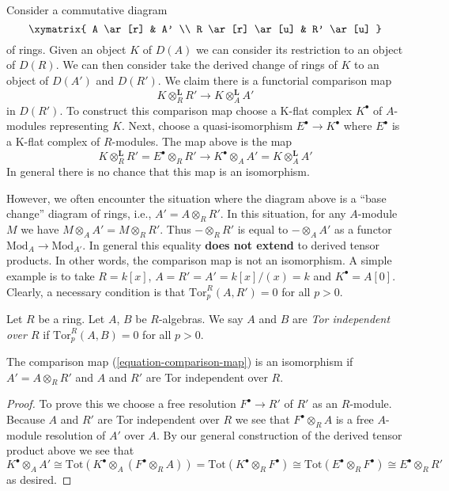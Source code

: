 \noindent
Consider a commutative diagram
$$
\xymatrix{
A \ar[r] & A' \\
R \ar[r] \ar[u] & R' \ar[u]
}
$$
of rings. Given an object $K$ of $D(A)$ we can consider its restriction
to an object of $D(R)$. We can then consider take the derived change of
rings of $K$ to an object of $D(A')$ and $D(R')$.
We claim there is a functorial comparison map
\begin{equation}
\label{equation-comparison-map}
K \otimes_R^{\mathbf{L}} R' \longrightarrow
K \otimes_A^{\mathbf{L}} A'
\end{equation}
in $D(R')$. To construct this comparison map choose a K-flat
complex $K^\bullet$ of $A$-modules representing $K$. Next, choose
a quasi-isomorphism $E^\bullet \to K^\bullet$ where $E^\bullet$
is a K-flat complex of $R$-modules. The map above is the map
$$
K \otimes_R^{\mathbf{L}} R' =
E^\bullet \otimes_R R'
\longrightarrow
K^\bullet \otimes_A A' =
K \otimes_A^{\mathbf{L}} A'
$$
In general there is no chance that this map is an isomorphism.

\medskip\noindent
However, we often encounter the situation where the diagram above
is a ``base change'' diagram of rings, i.e., $A' = A \otimes_R R'$.
In this situation, for any $A$-module $M$ we have
$M \otimes_A A' = M \otimes_R R'$. Thus $- \otimes_R R'$
is equal to $- \otimes_A A'$ as a functor $\text{Mod}_A \to \text{Mod}_{A'}$.
In general this equality {\bf does not extend} to derived tensor products.
In other words, the comparison map is not an isomorphism.
A simple example is to take
$R = k[x]$, $A = R' = A' = k[x]/(x) = k$ and $K^\bullet = A[0]$.
Clearly, a necessary condition is that $\text{Tor}_p^R(A, R') = 0$
for all $p > 0$.

\begin{definition}
\label{definition-tor-independent}
Let $R$ be a ring. Let $A$, $B$ be $R$-algebras. We say
$A$ and $B$ are {\it Tor independent over $R$} if
$\text{Tor}_p^R(A, B) = 0$ for all $p > 0$.
\end{definition}

\begin{lemma}
\label{lemma-base-change-comparison}
The comparison map (\ref{equation-comparison-map}) is an isomorphism
if $A' = A \otimes_R R'$ and $A$ and $R'$ are Tor independent over $R$.
\end{lemma}

\begin{proof}
To prove this we choose a free resolution $F^\bullet \to R'$
of $R'$ as an $R$-module. Because $A$ and $R'$ are Tor independent over $R$
we see that $F^\bullet \otimes_R A$ is a free $A$-module resolution of $A'$
over $A$. By our general construction of the derived tensor product
above we see that
$$
K^\bullet \otimes_A A' \cong
\text{Tot}(K^\bullet \otimes_A (F^\bullet \otimes_R A)) =
\text{Tot}(K^\bullet \otimes_R F^\bullet) \cong
\text{Tot}(E^\bullet \otimes_R F^\bullet) \cong
E^\bullet \otimes_R R'
$$
as desired.
\end{proof}

